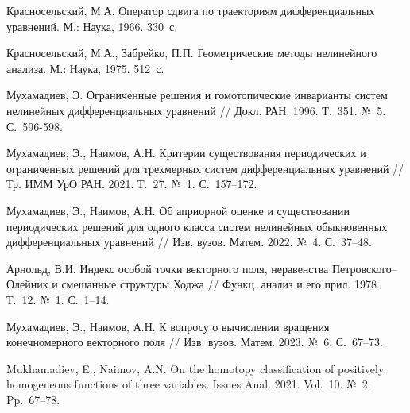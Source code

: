 \begin{thebibliography}{9} %

  Красносельский, М.А.   
{ Оператор сдвига по траекториям дифференциальных уравнений}.   М.: Наука, 1966.  330~с.

  Красносельский, М.А., Забрейко, П.П.    
{ Геометрические методы нелинейного анализа}.
  М.: Наука, 1975.  512~с.

 Мухамадиев, Э. { Ограниченные решения и гомотопические
инварианты систем  нелинейных дифференциальных уравнений} 
 // Докл. РАН.  1996.  Т.~351. №~5.  С.~596-598.

 Мухамадиев, Э., Наимов, А.Н. { Критерии существования периодических и ограниченных решений 
для трехмерных систем дифференциальных уравнений} 
 // Тр. ИММ УрО РАН.  2021.  Т.~27. №~1.
  С.~157–172.

 Мухамадиев, Э., Наимов, А.Н. { Об априорной оценке 
и существовании периодических решений для одного класса 
систем нелинейных обыкновенных дифференциальных уравнений} 
 // Изв. вузов. Матем.  2022.  №~4.
  С.~37–48.

 Арнольд, В.И. { Индекс особой точки векторного поля, неравенства 
Петровского–Олейник и смешанные структуры Ходжа} 
 // Функц. анализ и его прил.  1978.  Т.~12. №~1.
  С.~1–14.
 
 Мухамадиев, Э., Наимов, А.Н. { К вопросу о вычислении 
вращения конечномерного векторного поля} 
// Изв. вузов. Матем.  2023.  №~6.
 С.~67–73. 

 Mukhamadiev, E., Naimov, A.N. 
{ On the homotopy classification of positively homogeneous 
functions of three variables}. Issues Anal.   2021.   Vol.~10. №~2.
  Pp.~67–78.

\end{thebibliography}





%
